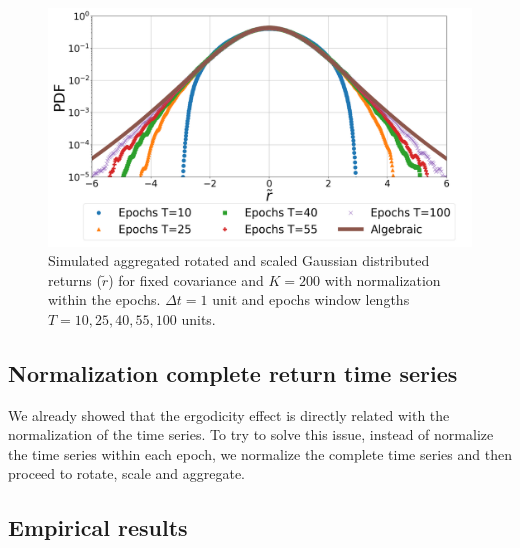 \begin{figure}[htbp]
    \centering
    \includegraphics[width=0.6\columnwidth]
    {figures/06_epochs_sim_alg_agg_ret_pairs_norm.png}
    \caption{Simulated aggregated rotated and scaled Gaussian distributed
             returns ($\tilde{r}$) for fixed covariance and $K=200$ with
             normalization within the epochs. $\Delta t = 1$ unit and epochs
             window lengths $T=10, 25, 40, 55, 100$ units.}
    \label{fig:epochs_alg_agg_ret_pairs_norm}
\end{figure}

\subsection{Normalization complete return time series}
\label{subsec:norm_full_sim}

We already showed that the ergodicity effect is directly related with the
normalization of the time series. To try to solve this issue, instead of
normalize the time series within each epoch, we normalize the complete time
series and then proceed to rotate, scale and aggregate.



\subsection{Empirical results}
\label{subsec:emp_results}